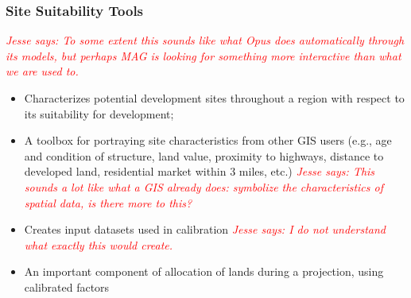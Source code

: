 \documentclass[titlepage]{article}
\begin{document}
\subsubsection{Site Suitability Tools}
\textcolor{red}{\textit{Jesse says: To some extent this sounds like what Opus does automatically through its models, but perhaps MAG is looking for something more interactive than what we are used to.}}
\begin{itemize}
	\item Characterizes potential development sites throughout a region with respect to its suitability for development;
	\item A toolbox for portraying site characteristics from other GIS users (e.g., age and condition of structure, land value, proximity to highways, distance to developed land, residential market within 3 miles, etc.)
		\textcolor{red}{\textit{Jesse says: This sounds a lot like what a GIS already does: symbolize the characteristics of spatial data, is there more to this?}}
	\item Creates input datasets used in calibration
		\textcolor{red}{\textit{Jesse says: I do not understand what exactly this would create.}}
	\item An important component of allocation of lands during a projection, using calibrated factors
\end{itemize}
\end{document}
